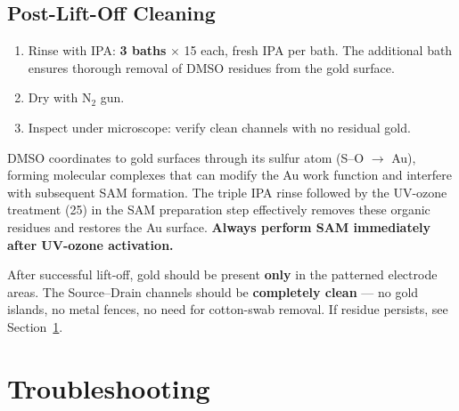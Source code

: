 \documentclass[11pt,a4paper]{article}
\begin{document}
\subsection{Post-Lift-Off Cleaning}

\begin{enumerate}[label=\alph*)]
    \item Rinse with IPA: \textbf{3 baths} $\times$ \SI{15}{\min} each,
          fresh IPA per bath. The additional bath ensures thorough removal
          of DMSO residues from the gold surface.
    \item Dry with N$_2$ gun.
    \item Inspect under microscope: verify clean channels with no
          residual gold.
\end{enumerate}

\begin{warningbox}
DMSO coordinates to gold surfaces through its sulfur atom (S--O $\to$ Au),
forming molecular complexes that can modify the Au work function and
interfere with subsequent SAM formation. The triple IPA rinse followed by
the UV-ozone treatment (\SI{25}{\min}) in the SAM preparation step
effectively removes these organic residues and restores the Au surface.
\textbf{Always perform SAM immediately after UV-ozone activation.}
\end{warningbox}

\begin{tipbox}
After successful lift-off, gold should be present \textbf{only} in the
patterned electrode areas. The Source--Drain channels should be
\textbf{completely clean} --- no gold islands, no metal fences, no need
for cotton-swab removal. If residue persists, see
Section~\ref{sec:troubleshooting}.
\end{tipbox}

\section{Troubleshooting}
\label{sec:troubleshooting}
\end{document}

